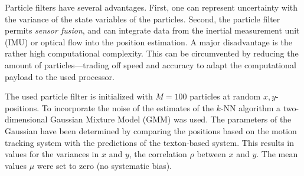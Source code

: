 Particle filters have several advantages. First, one can represent
uncertainty with the variance of the state variables of the
particles. Second, the particle filter permits \emph{sensor fusion},
and can integrate data from the inertial measurement unit (IMU) or
optical flow into the position estimation. A major disadvantage is the
rather high computational complexity. This can be circumvented by
reducing the amount of particles---trading off speed and accuracy to
adapt the computational payload to the used processor.

The used particle filter is initialized with $M = 100$ particles at
random $x, y$-positions. To incorporate the noise of the estimates of
the $k$-NN algorithm a two-dimensional Gaussian Mixture Model (GMM) was used. 
The parameters of the Gaussian have been determined by comparing the
positions based on the motion tracking system with the predictions of
the texton-based system.
This results in values for the variances in $x$ and $y$, the
correlation $\rho$ between $x$ and $y$. The mean values $\mu$ were set
to zero (no systematic bias).

